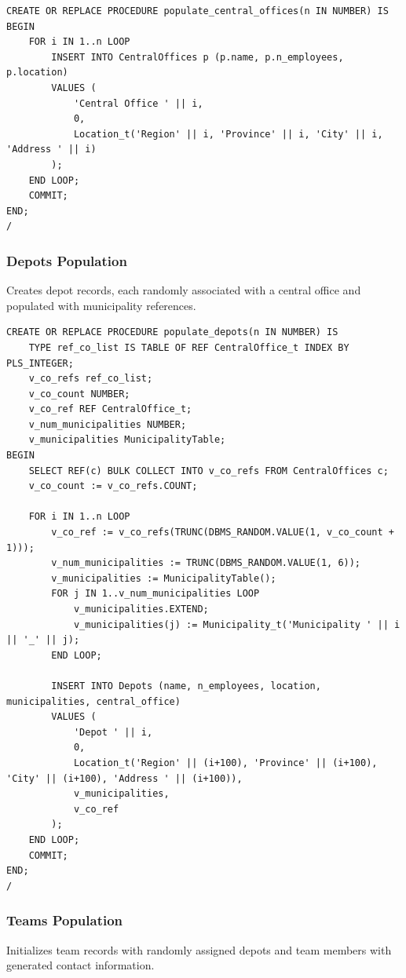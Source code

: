 \begin{verbatim}
CREATE OR REPLACE PROCEDURE populate_central_offices(n IN NUMBER) IS
BEGIN
    FOR i IN 1..n LOOP
        INSERT INTO CentralOffices p (p.name, p.n_employees, p.location)
        VALUES (
            'Central Office ' || i,
            0,
            Location_t('Region' || i, 'Province' || i, 'City' || i, 'Address ' || i)
        );
    END LOOP;
    COMMIT;
END;
/
\end{verbatim}

\subsubsection{Depots Population}
Creates depot records, each randomly associated with a central office and populated with municipality references.

\begin{verbatim}
CREATE OR REPLACE PROCEDURE populate_depots(n IN NUMBER) IS
    TYPE ref_co_list IS TABLE OF REF CentralOffice_t INDEX BY PLS_INTEGER;
    v_co_refs ref_co_list;
    v_co_count NUMBER;
    v_co_ref REF CentralOffice_t;
    v_num_municipalities NUMBER;
    v_municipalities MunicipalityTable;
BEGIN
    SELECT REF(c) BULK COLLECT INTO v_co_refs FROM CentralOffices c;
    v_co_count := v_co_refs.COUNT;

    FOR i IN 1..n LOOP
        v_co_ref := v_co_refs(TRUNC(DBMS_RANDOM.VALUE(1, v_co_count + 1)));
        v_num_municipalities := TRUNC(DBMS_RANDOM.VALUE(1, 6));
        v_municipalities := MunicipalityTable();
        FOR j IN 1..v_num_municipalities LOOP
            v_municipalities.EXTEND;
            v_municipalities(j) := Municipality_t('Municipality ' || i || '_' || j);
        END LOOP;

        INSERT INTO Depots (name, n_employees, location, municipalities, central_office)
        VALUES (
            'Depot ' || i,
            0,
            Location_t('Region' || (i+100), 'Province' || (i+100), 'City' || (i+100), 'Address ' || (i+100)),
            v_municipalities,
            v_co_ref
        );
    END LOOP;
    COMMIT;
END;
/
\end{verbatim}

\subsubsection{Teams Population}
Initializes team records with randomly assigned depots and team members with generated contact information.

